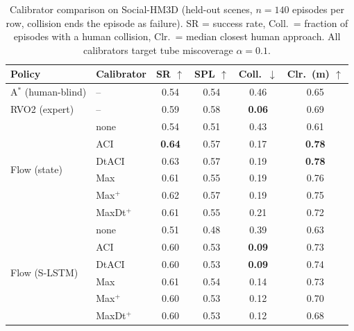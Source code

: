 
\begin{table}[t]
\centering
\caption{Calibrator comparison on Social-HM3D (held-out scenes, $n{=}140$
episodes per row, collision ends the episode as failure). SR = success rate,
Coll.\ = fraction of episodes with a human collision, Clr.\ = median closest
human approach. All calibrators target tube miscoverage $\alpha{=}0.1$.}
\label{tab:exp1}
\begin{tabular}{llcccc}
\toprule
Policy & Calibrator & SR $\uparrow$ & SPL $\uparrow$ & Coll.\ $\downarrow$ & Clr.\ (m) $\uparrow$ \\
\midrule
A$^*$ (human-blind)      & --      & 0.54 & 0.54 & 0.46 & 0.65 \\
RVO2 (expert)            & --      & 0.59 & 0.58 & \textbf{0.06} & 0.69 \\
\midrule
\multirow{6}{*}{Flow (state)}
                         & none    & 0.54 & 0.51 & 0.43 & 0.61 \\
                         & ACI     & \textbf{0.64} & 0.57 & 0.17 & \textbf{0.78} \\
                         & DtACI   & 0.63 & 0.57 & 0.19 & \textbf{0.78} \\
                         & Max     & 0.61 & 0.55 & 0.19 & 0.76 \\
                         & Max$^{+}$ & 0.62 & 0.57 & 0.19 & 0.75 \\
                         & MaxDt$^{+}$ & 0.61 & 0.55 & 0.21 & 0.72 \\
\midrule
\multirow{6}{*}{Flow (S-LSTM)}
                         & none    & 0.51 & 0.48 & 0.39 & 0.63 \\
                         & ACI     & 0.60 & 0.53 & \textbf{0.09} & 0.73 \\
                         & DtACI   & 0.60 & 0.53 & \textbf{0.09} & 0.74 \\
                         & Max     & 0.61 & 0.54 & 0.14 & 0.73 \\
                         & Max$^{+}$ & 0.60 & 0.53 & 0.12 & 0.70 \\
                         & MaxDt$^{+}$ & 0.60 & 0.53 & 0.12 & 0.68 \\
\bottomrule
\end{tabular}
\end{table}

